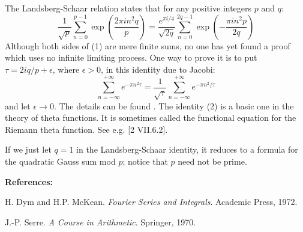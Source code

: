 \documentclass[12pt]{article}
\begin{document}
 
 
 
 
The Landsberg-Schaar relation states that for any positive integers $p$
and $q$: \begin{equation}
\frac{1}{\sqrt{p}}\sum_{n=0}^{p-1}\exp\left(\frac{2\pi in^2q}{p}\right)=
\frac{e^{\pi i/4}}{\sqrt{2q}}\sum_{n=0}^{2q-1}\exp\left(-\frac{\pi in^2p}{2q}\right)
\end{equation}
Although both sides of (1) are mere finite sums,
no one has yet found a proof which uses no infinite
limiting process. One way to prove it is to put
$\tau=2iq/p+\epsilon$, where $\epsilon>0$, in
this identity due to Jacobi:
\begin{equation}
\sum_{n=-\infty}^{+\infty}e^{-\pi n^2\tau}=\frac{1}{\sqrt{\tau}}
\sum_{n=-\infty}^{+\infty}e^{-\pi n^2/\tau}
\end{equation}
\noindent
and let $\epsilon\to 0$. The details can be found . The identity (2) is a basic one in the theory of
theta functions. It is sometimes called the functional equation for the Riemann theta function. See e.g. [2 VII.6.2].

If we just let $q=1$ in the Landsberg-Schaar identity, it reduces to a formula
for the quadratic Gauss sum mod $p$; notice that $p$ need not be prime.

\textbf{References:}

\noindent
[1] H. Dym and H.P. McKean. \emph{Fourier Series and Integrals}. Academic Press, 1972.

\noindent
[2] J.-P. Serre. \emph{A Course in Arithmetic}. Springer, 1970.
\end{document}
